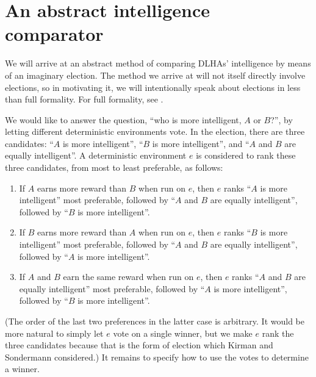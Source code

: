 \documentclass[twoside,11pt]{article}
\begin{document}
\section{An abstract intelligence comparator}

We will arrive at an abstract method of comparing DLHAs' intelligence by means of
an imaginary election. The method we arrive at will not itself directly involve elections,
so in motivating it, we will intentionally
speak about elections in less than full formality. For full formality, see \citet{kirman}.

We would like to answer the question,
``who is more intelligent, $A$ or $B$?'', by letting different
deterministic environments vote. In the election, there are three
candidates: ``$A$ is more intelligent'',
``$B$ is more intelligent'', and ``$A$ and $B$ are equally intelligent''.
A deterministic environment $e$ is considered to rank these three candidates,
from most to least
preferable, as follows:
\begin{enumerate}
    \item
    If $A$ earns more reward than $B$ when run on $e$,
    then $e$ ranks ``$A$ is more intelligent'' most preferable,
    followed by ``$A$ and $B$ are equally intelligent'', followed
    by ``$B$ is more intelligent''.
    \item
    If $B$ earns more reward than $A$ when run on $e$,
    then $e$ ranks ``$B$ is more intelligent'' most preferable,
    followed by ``$A$ and $B$ are equally intelligent'', followed
    by ``$A$ is more intelligent''.
    \item
    If $A$ and $B$ earn the same reward when run on $e$,
    then $e$ ranks ``$A$ and $B$ are equally intelligent'' most preferable,
    followed by ``$A$ is more intelligent'',
    followed by ``$B$ is more intelligent''.
\end{enumerate}
(The order of the last two preferences in the latter case is arbitrary.
It would be more natural to simply let $e$ vote on a single winner,
but we make $e$ rank the three candidates because that is the form
of election which
Kirman and Sondermann
considered.)
It remains to specify how to use the votes to determine a winner.
\end{document}
